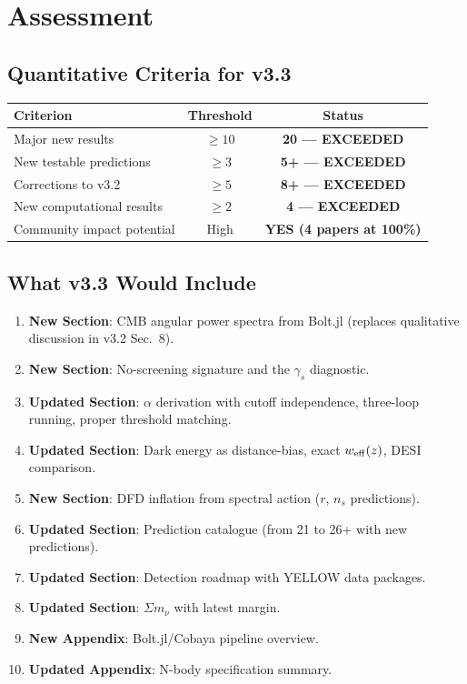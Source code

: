 \documentclass[11pt,a4paper]{article}
\begin{document}
\section{Assessment}

\subsection{Quantitative Criteria for v3.3}

\begin{center}
\begin{tabular}{lcc}
\toprule
\textbf{Criterion} & \textbf{Threshold} & \textbf{Status} \\
\midrule
Major new results & $\geq 10$ & \textbf{20 --- EXCEEDED} \\
New testable predictions & $\geq 3$ & \textbf{5+ --- EXCEEDED} \\
Corrections to v3.2 & $\geq 5$ & \textbf{8+ --- EXCEEDED} \\
New computational results & $\geq 2$ & \textbf{4 --- EXCEEDED} \\
Community impact potential & High & \textbf{YES (4 papers at 100\%)} \\
\bottomrule
\end{tabular}
\end{center}

\subsection{What v3.3 Would Include}

\begin{enumerate}
\item \textbf{New Section}: CMB angular power spectra from Bolt.jl (replaces qualitative discussion in v3.2 Sec.~8).
\item \textbf{New Section}: No-screening signature and the $\gamma_s$ diagnostic.
\item \textbf{Updated Section}: $\alpha$ derivation with cutoff independence, three-loop running, proper threshold matching.
\item \textbf{Updated Section}: Dark energy as distance-bias, exact $w_{\rm eff}(z)$, DESI comparison.
\item \textbf{New Section}: DFD inflation from spectral action ($r$, $n_s$ predictions).
\item \textbf{Updated Section}: Prediction catalogue (from 21 to 26+ with new predictions).
\item \textbf{Updated Section}: Detection roadmap with YELLOW data packages.
\item \textbf{Updated Section}: $\Sigma m_\nu$ with latest margin.
\item \textbf{New Appendix}: Bolt.jl/Cobaya pipeline overview.
\item \textbf{Updated Appendix}: N-body specification summary.
\end{enumerate}
\end{document}
